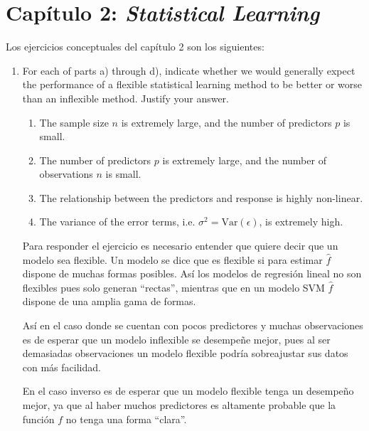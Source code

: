 \documentclass[a4paper,11pt]{article}
\begin{document}
\section{Capítulo 2: \textit{Statistical Learning}}
    Los ejercicios conceptuales del capítulo 2 son los siguientes:
    \begin{enumerate}
        \item For each of parts a) through d), indicate whether 
        we would generally expect the performance of a ﬂexible 
        statistical learning method to be better or worse than an 
        inﬂexible method. Justify your answer.
        \begin{enumerate}
            \item The sample size $n$ is extremely large, and the 
            number of predictors $p$ is small.
            \item The number of predictors $p$ is extremely 
            large, and the number of observations $n$ is small.
            \item The relationship between the predictors and 
            response is highly non-linear.
            \item The variance of the error terms, i.e. $
            \sigma^2=\text{Var}(\epsilon)$, is extremely high.
        \end{enumerate}
{\sl
        \begin{shaded}
            Para responder el ejercicio es necesario entender que
            quiere decir que un modelo sea flexible. Un modelo se
            dice que es flexible si para estimar $\hat{f}$ 
            dispone
            de muchas formas posibles. Así los modelos de 
            regresión lineal no son flexibles pues solo generan 
            ``rectas'', mientras que en un modelo SVM $\hat{f}
            $ dispone de una amplia gama de formas.
            
            Así en el caso donde se cuentan con pocos 
            predictores 
            y muchas observaciones es de esperar que un modelo 
            inflexible se desempeñe mejor, pues al ser 
            demasiadas 
            observaciones un modelo flexible podría sobreajustar 
            sus datos con más facilidad.
            
            En el caso inverso es de esperar que un modelo 
            flexible tenga un desempeño mejor, ya que al haber 
            muchos predictores es altamente probable que la 
            función $f$ no tenga una forma ``clara''.
            

\end{shaded}}
\end{enumerate}
\end{document}
